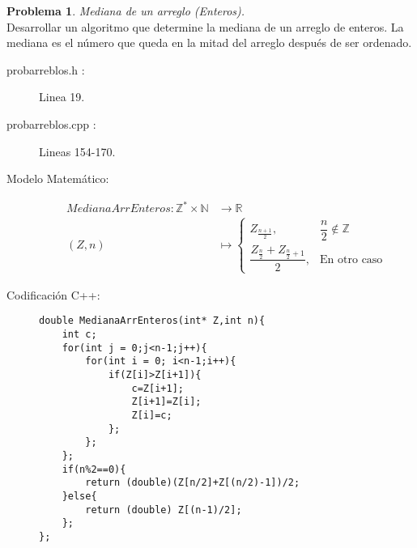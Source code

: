 \documentclass{article}
\theoremstyle{plain}
\theoremstyle{definition}
\newtheorem{problem}{Problema}
\begin{document}
\begin{problem} \emph{Mediana de un arreglo (Enteros).}\\
\hspace*{7mm}Desarrollar un algoritmo que determine la mediana de un arreglo de enteros.  La mediana es el número que queda en la mitad del arreglo después de ser ordenado.
\begin{description}
\item[probarreblos.h :] Linea 19. \item[probarreblos.cpp :] Lineas 154-170.

\item[Modelo Matemático:]
\begin{align*}
MedianaArrEnteros: \mathbb{Z}^{*}\times\mathbb{N} &\to \mathbb{R}\\
(Z,n) &\mapsto
\begin{cases}
Z_{\frac{n+1}{2}},& \dfrac{n}{2}\not\in \mathbb{Z}\\
\dfrac{Z_{\frac{n}{2}}+Z_{\frac{n}{2}+1}}{2},& \text{En otro caso}
\end{cases}
\end{align*}
%
\item[Codificación \textsf{C++}:]\hfill
%
\begin{verbatim}
double MedianaArrEnteros(int* Z,int n){
    int c;
    for(int j = 0;j<n-1;j++){
        for(int i = 0; i<n-1;i++){
            if(Z[i]>Z[i+1]){
                c=Z[i+1];
                Z[i+1]=Z[i];
                Z[i]=c;
            };
        };
    };
    if(n%2==0){
        return (double)(Z[n/2]+Z[(n/2)-1])/2;
    }else{
        return (double) Z[(n-1)/2];
    };
};
\end{verbatim}
\end{description}
\end{problem}
\end{document}

